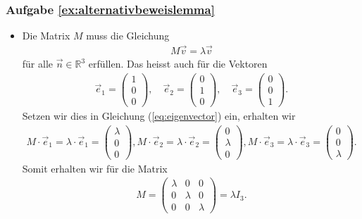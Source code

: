 \subsubsection*{Aufgabe \ref{ex:alternativbeweislemma}}
\begin{itemize}
    \item[a)] Die Matrix $M$ muss die Gleichung 
\begin{align} \label{eq:eigenvector}
    M \vec{v} = \lambda \vec{v}
\end{align}
für alle $\vec{n} \in \mathbb{R}^3$ erfüllen. Das heisst auch für die Vektoren
\begin{align}
    \vec{e}_1 = \begin{pmatrix} 1 \\ 0 \\ 0 \end{pmatrix}, \quad \vec{e}_2 = \begin{pmatrix} 0 \\ 1 \\ 0 \end{pmatrix}, \quad \vec{e}_3 = \begin{pmatrix} 0 \\ 0 \\ 1 \end{pmatrix}. \nonumber
\end{align}
Setzen wir dies in Gleichung (\ref{eq:eigenvector}) ein, erhalten wir 
\begin{align}
    M \cdot \vec{e}_1 = \lambda \cdot \vec{e}_1 = \begin{pmatrix} \lambda \\ 0 \\ 0 \end{pmatrix}, M \cdot \vec{e}_2 = \lambda \cdot \vec{e}_2 = \begin{pmatrix} 0 \\ \lambda \\ 0 \end{pmatrix}, M \cdot \vec{e}_3 = \lambda \cdot \vec{e}_3 = \begin{pmatrix} 0 \\ 0 \\ \lambda \end{pmatrix}. \nonumber
\end{align}
Somit erhalten wir für die Matrix 
\begin{align}
    M  = \begin{pmatrix} \lambda & 0 & 0 \\ 0 & \lambda & 0 \\ 0 & 0 & \lambda \end{pmatrix} = \lambda I_3 . \nonumber

\end{align}
\end{itemize}
